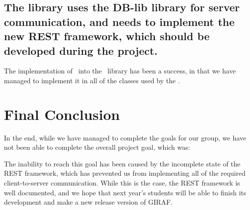 \subsection*{The library uses the DB-lib library for server communication, and
needs to implement the new REST framework, which should be developed during the
project.} The implementation of \rlib\ into the \clib\ library
has been a success, in that we have managed to implement it in all of the
classes used by the \lapp.

\section{Final Conclusion}
In the end, while we have managed to complete the goals for our group, we have
not been able to complete the overall project goal, which was:\nl

\nl

The inability to reach this goal has been caused by the incomplete state of the
REST framework, which has prevented us from implementing all of the required
client-to-server communication. While this is the case, the REST framework is
well documented, and we hope that next year's students will be able to finish
its development and make a new release version of GIRAF. 


